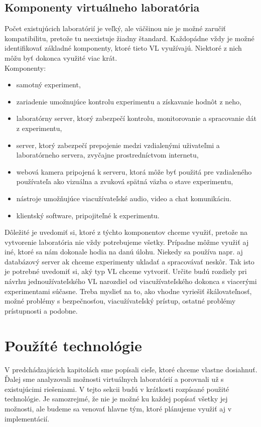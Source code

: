 \subsection{Komponenty virtuálneho laboratória}
Počet existujúcich laboratórií je veľký, ale väčšinou nie je možné zaručiť kompatibilitu, pretože tu neexistuje žiadny štandard. Každopádne vždy je možné identifikovať základné komponenty, ktoré tieto VL využívajú. Niektoré z nich môžu byť dokonca využité viac krát.\cite{article-components-vl}\\

\noindent Komponenty:
\begin{itemize}
  \item samotný experiment,
  \item zariadenie umožnujúce kontrolu experimentu a získavanie hodnôt z neho,
  \item laboratórny server, ktorý zabezpečí kontrolu, monitorovanie a spracovanie dát z experimentu,
  \item server, ktorý zabezpečí prepojenie medzi vzdialenými uživateľmi a laboratórneho servera, zvyčajne prostredníctvom internetu,
  \item webová kamera pripojená k serveru, ktorá môže byť použitá pre vzdialeného používateľa ako vizuálna a zvuková spätná väzba o stave experimentu,
  \item nástroje umožňujúce viacužívateľské audio, video a chat komunikáciu.
  \item klientský software, pripojiteľné k experimentu.\\
\end{itemize}

Dôležité je uvedomiť si, ktoré z týchto komponentov chceme využiť, pretože na vytvorenie laboratória nie vždy potrebujeme všetky. Prípadne môžme využiť aj iné, ktoré sa nám dokonale hodia na danú úlohu. Niekedy sa používa napr. aj databázový server ak chceme experimenty ukladať a spracovávať neskôr. Tak isto je potrebné uvedomiť si, aký typ VL chceme vytvoriť. Určite budú rozdiely pri návrhu jednoužívateľského VL narozdiel od viacužívateľského dokonca s viacerými experimentami súčasne. Treba myslieť na to, ako vhodne vyriešiť škálovateľnosť, možné problémy s bezpečnosťou, viacužívateľský prístup, ostatné problémy prístupnosti a podobne.


\section{Použíté technológie}\label{used-technologies}
V predchádzajúcich kapitolách sme popísali cieľe, ktoré chceme vlastne dosiahnuť. Ďalej sme analyzovali možnosti virtuálnych laboratórií a porovnali už s existujúcimi riešeniami. V tejto sekcii budú v krátkosti rozpísané použité technológie. Je samozrejmé, že nie je možné ku každej popísať všetky jej možnosti, ale budeme sa venovať hlavne tým, ktoré plánujeme využiť aj v implementácií.

